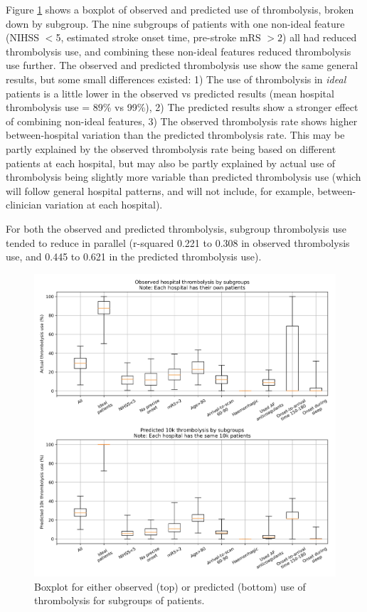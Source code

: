 Figure \ref{fig:results_boxplot} shows a boxplot of observed and predicted use of thrombolysis, broken down by subgroup. The nine subgroups of patients with one non-ideal feature (NIHSS $<$5, estimated stroke onset time, pre-stroke mRS $>2$) all had reduced thrombolysis use, and combining these non-ideal features reduced thrombolysis use further. The observed and predicted thrombolysis use show the same general results, but some small differences existed: 1) The use of thrombolysis in \emph{ideal} patients is a little lower in the observed vs predicted results (mean hospital thrombolysis use = 89\% vs 99\%), 2) The predicted results show a stronger effect of combining non-ideal features, 3) The observed thrombolysis rate shows higher between-hospital variation than the predicted thrombolysis rate. This may be partly explained by the observed thrombolysis rate being based on different patients at each hospital, but may also be partly explained by actual use of thrombolysis being slightly more variable than predicted thrombolysis use (which will follow general hospital patterns, and will not include, for example, between-clinician variation at each hospital).

For both the observed and predicted thrombolysis, subgroup thrombolysis use tended to reduce in parallel (r-squared 0.221 to 0.308 in observed thrombolysis use, and 0.445 to 0.621 in the predicted thrombolysis use). 

\begin{figure}[!h]
\centering
\includegraphics[width=1\textwidth]{./images/15a_xgb_10_features_10k_cohort_actual_vs_modelled_subgroup_violin}
\caption{Boxplot for either observed (top) or predicted (bottom) use of thrombolysis for subgroups of patients.}
\label{fig:results_boxplot}
\end{figure}
\newpage





